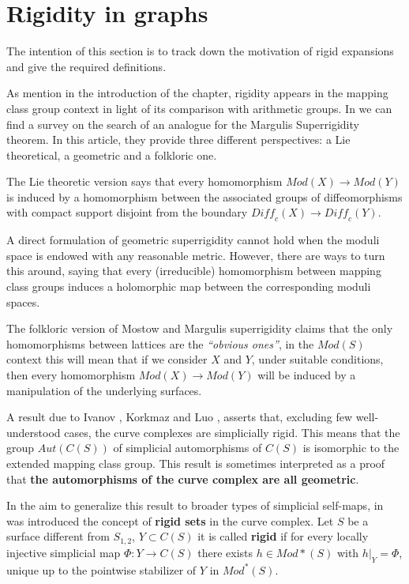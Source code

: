 \section{Rigidity in graphs}

The intention of this section is to track down the motivation of rigid expansions and give the required definitions.

As mention in the introduction of the chapter, rigidity appears in the mapping class group context in light of its comparison with arithmetic groups. In \cite[Aramayona, Souto 16]{rigidityJA} we can find a survey on the search of an analogue for the Margulis Superrigidity theorem. In this article, they provide three different perspectives: a Lie theoretical, a geometric and a folkloric one.

The Lie theoretic version says that every homomorphism $Mod(X) \to Mod(Y)$ is induced by a homomorphism between the associated groups of diffeomorphisms with compact support disjoint from the boundary $\textit{Diff}_{c}(X) \to \textit{Diff}_{c}(Y)$.

A direct formulation of geometric superrigidity cannot hold when the moduli space is endowed with any reasonable metric. However, there are ways to turn this around, saying that every (irreducible) homomorphism between mapping class groups induces a holomorphic map between the corresponding moduli spaces.

The folkloric version of Mostow and Margulis superrigidity claims that the only homomorphisms between lattices are the \textit{“obvious ones”}, in the $Mod(S)$ context this will mean that if we consider $X$ and $Y$, under suitable conditions, then every homomorphism $Mod(X) \to Mod(Y)$ will be induced by a manipulation of the underlying surfaces. 

A result due to Ivanov \cite[Ivanov 97]{celebratedIvanov}, Korkmaz \cite[Korkmaz 99]{celebratedKorkmaz} and Luo \cite[Luo 00]{celebratedLuo}, asserts that, excluding few well-understood cases, the curve complexes are simplicially rigid. This means that the group $Aut(C(S))$ of simplicial automorphisms of $C(S)$ is isomorphic to the extended mapping class group. This result is sometimes interpreted as a proof that \textbf{the automorphisms  of  the  curve  complex  are  all geometric}.

In the aim to generalize this result to broader types of simplicial self-maps, in \cite[Aramayona, Leininger 12]{finiteRigidSetsJA} was introduced the concept of \textbf{rigid sets} in the curve complex. Let $S$ be a surface different from $S_{1,2}$,  $Y \subset C(S)$ it is called \textbf{rigid} if for every locally injective simplicial map $\Phi  : Y \to C(S)$ there exists $h \in Mod{\ast}(S)$ with $h|_{Y} = \Phi$, unique up to the pointwise stabilizer of $Y$ in $Mod^{\ast}(S)$.

